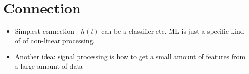 \documentclass[12pt, letter]{article}
\begin{document}
\section{Connection}%
\label{sec:connection}
\begin{itemize}
	\item Simplest connection - $h(t)$ can be a classifier etc. ML is just a specific kind of of non-linear processing.
	\item Another idea: signal processing is how to get a small amount of features from a large amount of data
\end{itemize}
\end{document}
